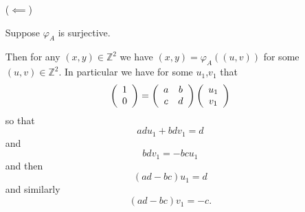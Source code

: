 \documentclass{article}
\begin{document}
\begin{Answer}
\begin{enumerate}
{\begin{itemize}
{$$\begin{array}{c}
        \end{array}\right) =
        \varphi_A \left(
          x
          \left(\begin{array}{r}
            d \\ -c
          \end{array}\right) +
          y
          \left(\begin{array}{r}
            -b \\ a
          \end{array}\right)
        \right)
        $$
        Similarly if $\det(A) = -1$ we have
        $$
        \left(\begin{array}{c}
          x \\ y
        \end{array}\right) =
        \varphi_A \left(
          -x
          \left(\begin{array}{r}
            d \\ -c
          \end{array}\right) +
          -y
          \left(\begin{array}{r}
            -b \\ a
          \end{array}\right)
        \right)
        $$
        and therefore $(x, y) \in \mathrm{Im}(\varphi_A)$ in either of
        these cases. Therefore $\varphi_A$ is surjective.
      }
      \item[($\impliedby$)]
      {
        Suppose $\varphi_A$ is surjective.

        Then for any $(x, y) \in
        \mathbb{Z}^2$ we have $(x, y) = \varphi_A((u, v))$ for some
        $(u, v) \in \mathbb{Z}^2$. In particular we have for some
        $u_1$,$v_1$ that
        $$
        \left(\begin{array}{c}
          1 \\ 0
        \end{array}\right) =
        \left(\begin{array}{c c}
          a & b \\ c & d
        \end{array}\right)
        \left(\begin{array}{c}
          u_1 \\ v_1
        \end{array}\right)
        $$
        so that
        $$
        adu_1 + bdv_1 = d
        $$
        and
        $$
        bdv_1 = -bcu_1
        $$
        and then
        $$
        (ad - bc)u_1 = d
        $$
        and similarly
        $$
        (ad - bc)v_1 = -c.
        $$

}
\end{itemize}}
\end{enumerate}
\end{Answer}
\end{document}
